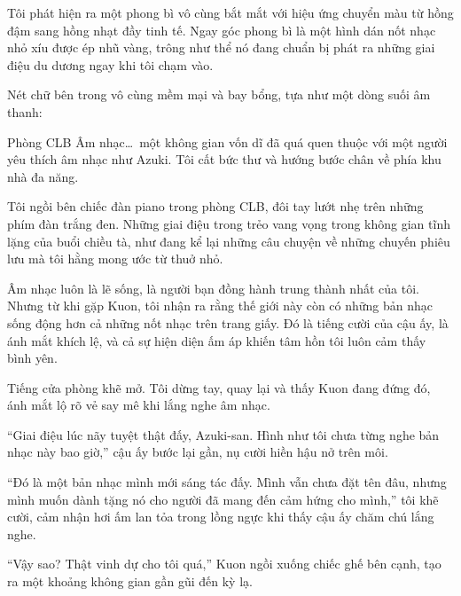 \documentclass[../main.tex]{subfiles}
\begin{document}
\newpage
\label{azuki}

Tôi phát hiện ra một phong bì vô cùng bắt mắt với hiệu ứng chuyển màu từ hồng đậm sang hồng nhạt đầy tinh tế. Ngay góc phong bì là một hình dán nốt nhạc nhỏ xíu được ép nhũ vàng, trông như thể nó đang chuẩn bị phát ra những giai điệu du dương ngay khi tôi chạm vào.

Nét chữ bên trong vô cùng mềm mại và bay bổng, tựa như một dòng suối âm thanh:


Phòng CLB Âm nhạc\dots\ một không gian vốn dĩ đã quá quen thuộc với một người yêu thích âm nhạc như Azuki. Tôi cất bức thư và hướng bước chân về phía khu nhà đa năng.

\ct


Tôi ngồi bên chiếc đàn piano trong phòng CLB, đôi tay lướt nhẹ trên những phím đàn trắng đen. Những giai điệu trong trẻo vang vọng trong không gian tĩnh lặng của buổi chiều tà, như đang kể lại những câu chuyện về những chuyến phiêu lưu mà tôi hằng mong ước từ thuở nhỏ.

Âm nhạc luôn là lẽ sống, là người bạn đồng hành trung thành nhất của tôi. Nhưng từ khi gặp Kuon, tôi nhận ra rằng thế giới này còn có những bản nhạc sống động hơn cả những nốt nhạc trên trang giấy. Đó là tiếng cười của cậu ấy, là ánh mắt khích lệ, và cả sự hiện diện ấm áp khiến tâm hồn tôi luôn cảm thấy bình yên.

Tiếng cửa phòng khẽ mở. Tôi dừng tay, quay lại và thấy Kuon đang đứng đó, ánh mắt lộ rõ vẻ say mê khi lắng nghe âm nhạc.

``Giai điệu lúc nãy tuyệt thật đấy, Azuki-san. Hình như tôi chưa từng nghe bản nhạc này bao giờ,'' cậu ấy bước lại gần, nụ cười hiền hậu nở trên môi.

``Đó là một bản nhạc mình mới sáng tác đấy. Mình vẫn chưa đặt tên đâu, nhưng mình muốn dành tặng nó cho người đã mang đến cảm hứng cho mình,'' tôi khẽ cười, cảm nhận hơi ấm lan tỏa trong lồng ngực khi thấy cậu ấy chăm chú lắng nghe.

``Vậy sao? Thật vinh dự cho tôi quá,'' Kuon ngồi xuống chiếc ghế bên cạnh, tạo ra một khoảng không gian gần gũi đến kỳ lạ.
\end{document}
